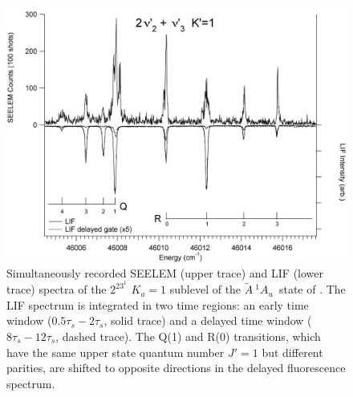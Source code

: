 \documentclass[12pt]{mitthesis}
\newcommand{\astate}{$
  \tilde{A} \: ^1\!A_u
  $}
\newcommand{\Ka}[1]{$K_a\!\!=\!#1$}
\begin{document}


\begin{figure}
  \caption{Simultaneously recorded SEELEM (upper trace) and LIF (lower
    trace) spectra of the $2^23^1$ \Ka{1} sublevel of the \astate\
    state of .  The LIF spectrum is integrated in two time
    regions: an early time window ($0.5\tau_s-2\tau_s$, solid trace)
    and a delayed time window ($8\tau_s-12\tau_s$, dashed trace).  The
    Q(1) and R(0) transitions, which have the same upper state quantum
    number $J'=1$ but different parities, are shifted to opposite
    directions in the delayed fluorescence spectrum.}
  \label{fig:spectrum-2231}
  \centering
  \vspace{1cm}
  \includegraphics[width=7in,angle=90]{acetylene-2231-q4r3.png}
\end{figure}
\end{document}

